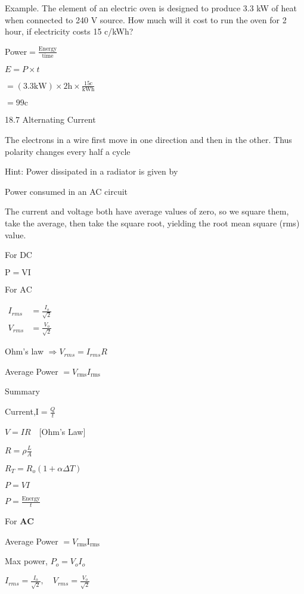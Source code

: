 \documentclass{extarticle}
\begin{document}
Example. The element of an electric oven is designed to
produce 3.3 kW of heat when connected to 240 V source.
How much will it cost to run the oven for 2 hour, if electricity
costs 15 c/kWh?

Power$=\frac{\text {Energy}}{\text {time}}$

$E=P \times t$

$=(3.3 \mathrm{kW}) \times 2 \mathrm{h} \times \frac{15 \mathrm{c}}{\mathrm{kWh}}$

$=99 \mathrm{c}$



18.7 Alternating Current

The electrons in a wire first
move in one direction and
then in the other. Thus
polarity changes every half a
cycle

Hint: Power dissipated in a
radiator is given by


Power consumed in an AC circuit

The current and voltage both have average values of
zero, so we square them, take the average, then take the
square root, yielding the root mean square (rms) value.

For DC

$\mathrm{P}=\mathrm{V} \mathrm{I}$

For $\mathrm{AC}$

$\begin{aligned} I_{r m s} &=\frac{I_{o}}{\sqrt{2}} \\ V_{r m s} &=\frac{V_{o}}{\sqrt{2}} \end{aligned}$

Ohm's law $\Rightarrow V_{r m s}=I_{r m s} R$

Average Power $=V_{\text {rms}} I_{\text {rms}}$




Summary


Current,I$=\frac{Q}{t}$

$V=I R \quad[$Ohm's Law$]$

$R=\rho \frac{L}{A}$

$R_{T}=R_{o}(1+\alpha \Delta T)$

$P=V I$

$P=\frac{\text {Energy}}{t}$

For $\mathbf{AC}$

Average Power $=V_{\text {rms}}$I$_{\text {rms}}$

Max power, $P_{o}=V_{o} I_{o}$

$I_{r m s}=\frac{I_{o}}{\sqrt{2}}, \quad V_{r m s}=\frac{V_{o}}{\sqrt{2}}$
\end{document}
